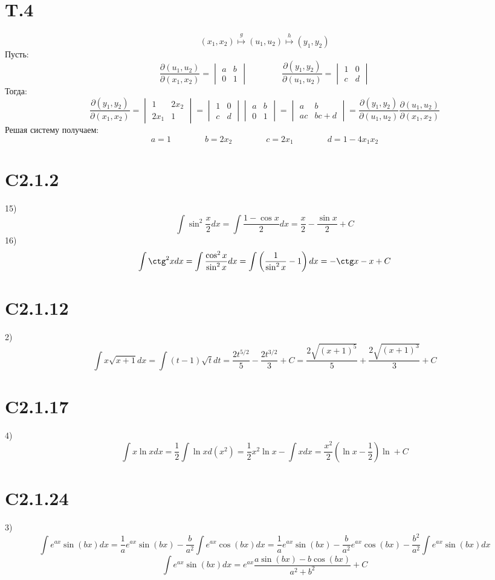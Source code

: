 \documentclass[a4paper,12pt]{article} %
\begin{document}
\section*{T.4}
$$(x_1,x_2)\overset{g}{\mapsto}(u_1,u_2)\overset{h}{\mapsto}(y_1,y_2)$$
Пусть:
$$\frac{\partial(u_1,u_2)}{\partial(x_1,x_2)}=\begin{vmatrix*}a&b\\0&1\end{vmatrix*}\quad\quad\quad\quad\frac{\partial(y_1,y_2)}{\partial(u_1,u_2)}=\begin{vmatrix*}1&0\\c&d\end{vmatrix*}$$
Тогда:
$$\frac{\partial(y_1,y_2)}{\partial(x_1,x_2)}=\begin{vmatrix*}1&2x_2\\2x_1&1\end{vmatrix*}=\begin{vmatrix*}1&0\\c&d\end{vmatrix*}\begin{vmatrix*}a&b\\0&1\end{vmatrix*}=\begin{vmatrix*}a&b\\ac&bc+d\end{vmatrix*}=\frac{\partial(y_1,y_2)}{\partial(u_1,u_2)}\frac{\partial(u_1,u_2)}{\partial(x_1,x_2)}$$
Решая систему получаем:
$$a=1\quad\quad\quad\quad b=2x_2\quad\quad\quad\quad c=2x_1\quad\quad\quad\quad d=1-4x_1x_2$$
\section*{C2.1.2}15)$$\int\sin^2\frac{x}{2}dx=\int\frac{1-\cos x}{2}dx=\frac{x}{2}-\frac{\sin x}{2}+C$$
16)$$\int\ctg^2xdx=\int\frac{\cos^2x}{\sin^2x}dx=\int\left(\frac{1}{\sin^2x}-1\right)dx=-\ctg x - x+C$$
\section*{C2.1.12}2)$$\int x\sqrt{x+1}dx=\int(t-1)\sqrt{t}dt=\frac{2t^{5/2}}{5}-\frac{2t^{3/2}}{3}+C=\frac{2\sqrt{(x+1)^5}}{5}+\frac{2\sqrt{(x+1)^3}}{3}+C$$
\section*{C2.1.17}4)$$\int x\ln xdx=\frac{1}{2}\int\ln xd(x^2)=\frac{1}{2}x^2\ln x-\int xdx=\frac{x^2}{2}\left(\ln x-\frac{1}{2}\right)\ln+C$$
\section*{C2.1.24}3)$$\int e^{ax}\sin(bx)dx=\frac{1}{a}e^{ax}\sin(bx)-\frac{b}{a^2}\int e^{ax}\cos(bx)dx=\frac{1}{a}e^{ax}\sin(bx)-\frac{b}{a^2}e^{ax}\cos(bx)-\frac{b^2}{a^2}\int e^{ax}\sin(bx)dx$$
$$\int e^{ax}\sin(bx)dx=e^{ax}\frac{a\sin (bx)-b\cos (bx)}{a^2+b^2}+C$$
\end{document}
